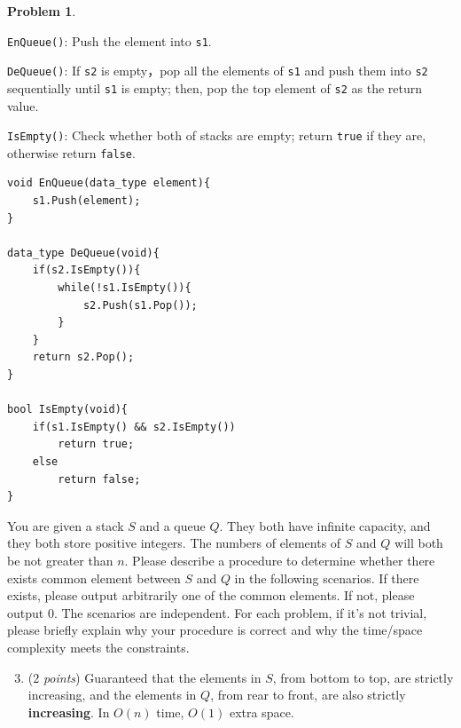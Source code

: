 \documentclass[12pt,a4paper]{report}
\newcommand{\points}[1]{ ($#1$ \textit{points}) }
\theoremstyle{definition}
\newtheorem{problem}{\textbf{Problem}}
\newcommand\NoIndent[1]{
  \par\vbox{\parbox[t]{\linewidth}{#1}}
}
\newcommand{\solution}{\textbf{\NoIndent{Solution.}}}
\theoremstyle{definition}
\begin{document}
\begin{problem}
\begin{enumerate}[label=\alph*.]
\begin{framed}
\texttt{EnQueue()}: Push the element into \texttt{s1}.

\texttt{DeQueue()}: If \texttt{s2} is empty，pop all the elements of \texttt{s1} and push them into \texttt{s2} sequentially until \texttt{s1} is empty; then, pop the top element of \texttt{s2} as the return value.

\texttt{IsEmpty()}: Check whether both of stacks are empty; return \texttt{true} if they are, otherwise return \texttt{false}.

\begin{lstlisting}[style=CStyle]
void EnQueue(data_type element){
	s1.Push(element);
}

data_type DeQueue(void){
	if(s2.IsEmpty()){
		while(!s1.IsEmpty()){
			s2.Push(s1.Pop());
		}
	}
	return s2.Pop();
}

bool IsEmpty(void){
	if(s1.IsEmpty() && s2.IsEmpty())
		return true;
	else
		return false;
}
\end{lstlisting}
\end{framed}
\end{enumerate}
    You are given a stack $S$ and a queue $Q$. They both have infinite capacity, and they both store positive integers. The numbers of elements of $S$ and $Q$ will both be not greater than $n$. Please describe a procedure to determine whether there exists common element between $S$ and $Q$ in the following scenarios. If there exists, please output arbitrarily one of the common elements. If not, please output $0$.  The scenarios are independent.
    For each problem, if it's not trivial, please briefly explain why your procedure is correct and why the time/space complexity meets the constraints.
\begin{enumerate}[label=\alph*.]
    \setcounter{enumi}{2}
\item \points{2}Guaranteed that the elements in $S$, from bottom to top, are strictly increasing, and the elements in $Q$, from rear to front, are also strictly \textbf{increasing}. In $O(n)$ time, $O(1)$ extra space.
\end{enumerate}
\end{problem}
\end{document}
